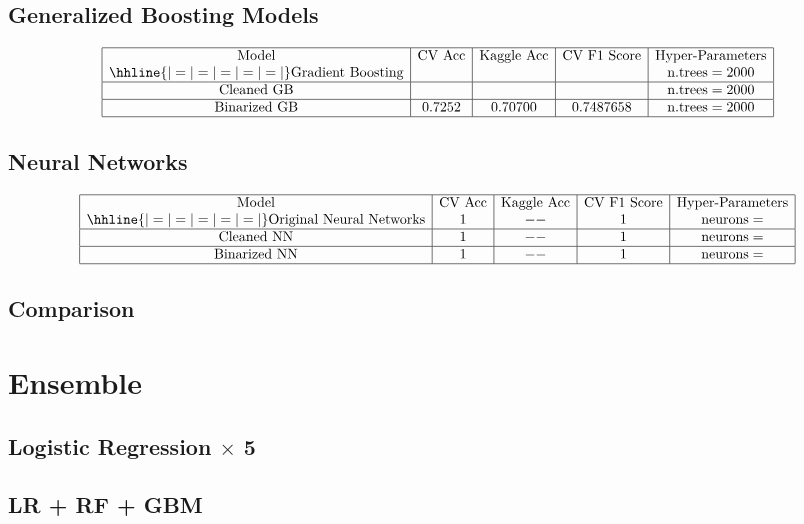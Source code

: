 \documentclass{article}
\begin{document}
\subsection{Generalized Boosting Models}
$$\begin{array}{|c|c|c|c|c|}
\hline
\text{Model} & \text{CV Acc} & \text{Kaggle Acc} & \text{CV F1 Score} & \text{Hyper-Parameters} \\
\hhline{|=|=|=|=|=|}
\text{Gradient Boosting} &  &  &  & \text{n.trees} = 2000 \\
\hline
\text{Cleaned GB} &  &  &  & \text{n.trees} = 2000 \\
\hline
\text{Binarized GB} & 0.7252 & 0.70700 & 0.7487658 & \text{n.trees} = 2000 \\
\hline
\end{array}$$

\subsection{Neural Networks}
$$\begin{array}{|c|c|c|c|c|}
\hline
\text{Model} & \text{CV Acc} & \text{Kaggle Acc} & \text{CV F1 Score} & \text{Hyper-Parameters} \\
\hhline{|=|=|=|=|=|}
\text{Original Neural Networks} & 1 & -- & 1 & \text{neurons} = \\
\hline
\text{Cleaned NN} & 1 & -- & 1 & \text{neurons} = \\
\hline
\text{Binarized NN} & 1 & -- & 1 & \text{neurons} = \\
\hline
\end{array}$$

\subsection{Comparison}

\section{Ensemble}

\subsection{Logistic Regression $\times$ 5}

\subsection{LR + RF + GBM}
\end{document}
